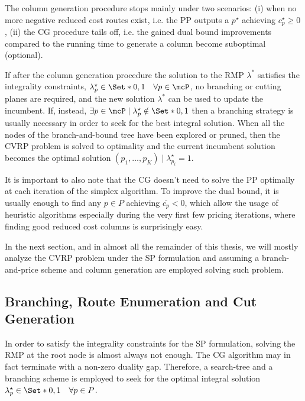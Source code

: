 The column generation procedure stops mainly under two scenarios:
(i) when no more negative reduced cost routes exist, i.e. the PP outputs a $p^\star$ achieving $c^\star_p \ge 0$,
(ii) the CG procedure tails off, i.e. the gained dual bound improvements compared to the running time to generate a column become suboptimal (optional).

If after the column generation procedure
the solution to the RMP $\lambda^*$ satisfies the integrality constraints,
$\lambda^\star_p \in \Set*{0, 1} \quad \forall p \in \mcP$,
no branching or cutting planes are required,
and the new solution $\lambda^*$ can be used to update the incumbent.
If, instead,
$\exists p \in \mcP \mid \lambda^\star_p \notin \Set*{0, 1}$
then a branching strategy is usually necessary
in order to seek for the best integral solution.
When all the nodes of the branch-and-bound tree have been explored or pruned,
then the CVRP problem is solved to optimality
and the current incumbent solution becomes the optimal solution
$(p_1, \dots, p_K) \mid \lambda^\star_{p_i} = 1$.

\medskip

It is important to also note that
the CG doesn't need to solve the PP optimally at each iteration of the simplex algorithm.
To improve the dual bound,
it is usually enough to find any $p \in P$ achieving $\bar{c_p} < 0$,
which allow the usage of heuristic algorithms
especially during the very first few pricing iterations,
where finding good reduced cost columns is surprisingly easy.

\medskip

In the next section, and in almost all the remainder of this thesis,
we will mostly analyze the CVRP problem under the SP formulation
and assuming a branch-and-price scheme and column generation
are employed solving such problem.

\subsection{Branching, Route Enumeration and Cut Generation}
\label{sec:intro-branching-and-cut-generation-within-bap-frameworks}

In order to satisfy the integrality constraints for the SP formulation,
solving the RMP at the root node is almost always not enough.
The CG algorithm may in fact terminate with a non-zero duality gap.
Therefore,
a search-tree and a branching scheme is employed
to seek for the optimal integral solution $\lambda^\star_p \in \Set*{0, 1} \quad \forall p \in P$.

